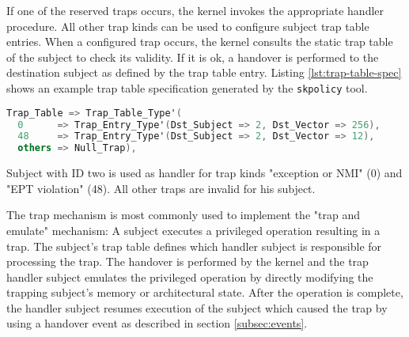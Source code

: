 If one of the reserved traps occurs, the kernel invokes the appropriate handler
procedure. All other trap kinds can be used to configure subject trap table
entries. When a configured trap occurs, the kernel consults the static trap
table of the subject to check its validity. If it is ok, a handover is performed
to the destination subject as defined by the trap table entry. Listing
\ref{lst:trap-table-spec} shows an example trap table specification generated by
the \texttt{skpolicy} tool.

\begin{lstlisting}[language=Ada, label=lst:trap-table-spec, caption=Trap table specification]
Trap_Table => Trap_Table_Type'(
  0      => Trap_Entry_Type'(Dst_Subject => 2, Dst_Vector => 256),
  48     => Trap_Entry_Type'(Dst_Subject => 2, Dst_Vector => 12),
  others => Null_Trap),
\end{lstlisting}

Subject with ID two is used as handler for trap kinds "exception or
NMI" (0) and "EPT violation" (48). All other traps are invalid for
his subject.

The trap mechanism is most commonly used to implement the "trap and emulate"
mechanism: A subject executes a privileged operation resulting in a trap. The
subject's trap table defines which handler subject is responsible for processing
the trap. The handover is performed by the kernel and the trap handler subject
emulates the privileged operation by directly modifying the trapping subject's
memory or architectural state. After the operation is complete, the handler
subject resumes execution of the subject which caused the trap by using
a handover event as described in section \ref{subsec:events}.
